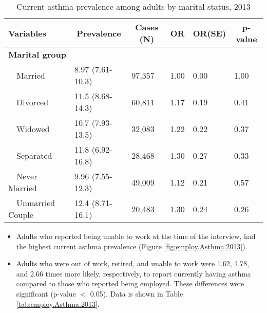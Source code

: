 \begin{table}[H]
\caption{Current asthma prevalence  among adults by marital status, 2013\label{tab:marital.Asthma.2013}} 
\begin{center}
\begin{tabular}{llllll}
\hline\hline
\multicolumn{1}{l}{Variables}&\multicolumn{1}{c}{Prevalence}&\multicolumn{1}{c}{Cases (N)}&\multicolumn{1}{c}{OR}&\multicolumn{1}{c}{OR(SE)}&\multicolumn{1}{c}{p-value}\tabularnewline
\hline
{\bfseries Marital group}&&&&&\tabularnewline
~~Married&8.97 (7.61-10.3)&97,357&1.00&0.00&1.00\tabularnewline
~~Divorced&11.5 (8.68-14.3)&60,811&1.17&0.19&0.41\tabularnewline
~~Widowed&10.7 (7.93-13.5)&32,083&1.22&0.22&0.37\tabularnewline
~~Separated&11.8 (6.92-16.8)&28,468&1.30&0.27&0.33\tabularnewline
~~Never Married&9.96 (7.55-12.3)&49,009&1.12&0.21&0.57\tabularnewline
~~Unmarried Couple&12.4 (8.71-16.1)&20,483&1.30&0.24&0.26\tabularnewline
\hline
\end{tabular}\end{center}

\end{table}

 
 \newpage
\begin{itemize}


\item Adults who reported being unable to work at the time of the interview, had the highest current asthma prevalence (Figure \ref{fig:employ.Asthma.2013}).

\item Adults who were out of work, retired, and unable to work were 1.62, 1.78, and 2.66 times more likely, respectively, to report currently having asthma compared to those who reported being employed. These differences were significant (p-value $<$ 0.05). 
Data is shown in Table \ref{tab:employ.Asthma.2013}.


\end{itemize}

